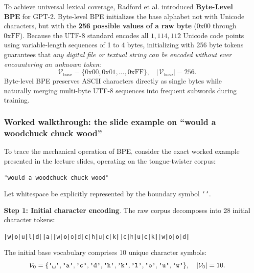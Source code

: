 \documentclass[../../main.tex]{subfiles}
\begin{document}
To achieve universal lexical coverage, Radford et al. \cite{radford2019} introduced \textbf{Byte-Level BPE} for GPT-2. Byte-level BPE initializes the base alphabet not with Unicode characters, but with the \textbf{256 possible values of a raw byte} ($0\text{x}00$ through $0\text{xFF}$). Because the UTF-8 standard encodes all $1{,}114{,}112$ Unicode code points using variable-length sequences of 1 to 4 bytes, initializing with 256 byte tokens guarantees that \emph{any digital file or textual string can be encoded without ever encountering an unknown token}:
\begin{equation}
\label{eq:byte_level_bpe_init}
\mathcal{V}_{\text{base}} = \{0\text{x}00, 0\text{x}01, \dots, 0\text{xFF}\}, \quad |\mathcal{V}_{\text{base}}| = 256.
\end{equation}
Byte-level BPE preserves ASCII characters directly as single bytes while naturally merging multi-byte UTF-8 sequences into frequent subwords during training.

\subsubsection{Worked walkthrough: the slide example on ``would a woodchuck chuck wood''}
To trace the mechanical operation of BPE, consider the exact worked example presented in the lecture slides, operating on the tongue-twister corpus:
\begin{center}
\texttt{"would a woodchuck chuck wood"}
\end{center}
Let whitespace be explicitly represented by the boundary symbol \texttt{'\textvisiblespace{}'}.

\noindent\textbf{Step 1: Initial character encoding}.\newline
The raw corpus decomposes into 28 initial character tokens:
\begin{center}
\texttt{|w|o|u|l|d|\textvisiblespace{}|a|\textvisiblespace{}|w|o|o|d|c|h|u|c|k|\textvisiblespace{}|c|h|u|c|k|\textvisiblespace{}|w|o|o|d|}
\end{center}
The initial base vocabulary comprises 10 unique character symbols:
\begin{equation}
\mathcal{V}_0 = \{\text{\texttt{'\textvisiblespace{}'}}, \text{\texttt{'a'}}, \text{\texttt{'c'}}, \text{\texttt{'d'}}, \text{\texttt{'h'}}, \text{\texttt{'k'}}, \text{\texttt{'l'}}, \text{\texttt{'o'}}, \text{\texttt{'u'}}, \text{\texttt{'w'}}\}, \quad |\mathcal{V}_0| = 10.
\end{equation}
\end{document}
